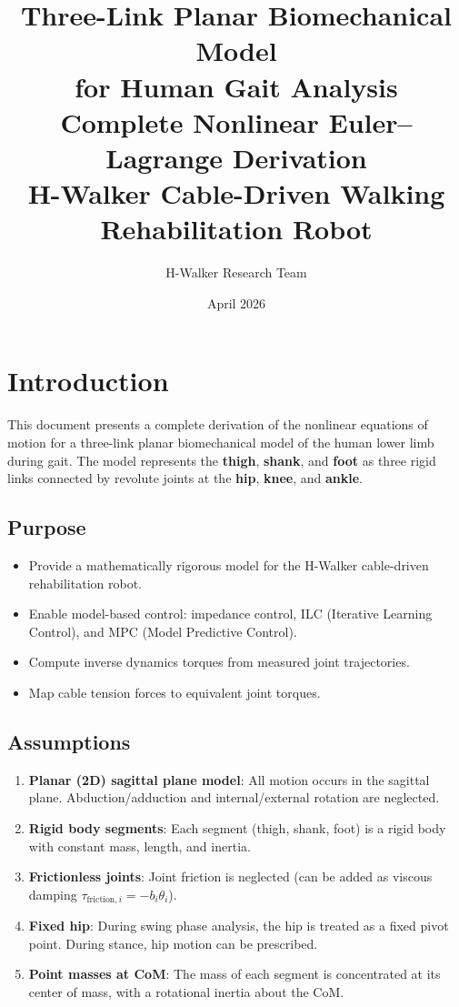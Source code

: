 \documentclass[11pt,a4paper]{article}
\title{
    \vspace{-1cm}
    {\LARGE \textbf{Three-Link Planar Biomechanical Model}} \\[0.3cm]
    {\Large \textbf{for Human Gait Analysis}} \\[0.5cm]
    {\large Complete Nonlinear Euler--Lagrange Derivation} \\[0.3cm]
    {\normalsize H-Walker Cable-Driven Walking Rehabilitation Robot}
}
\author{H-Walker Research Team}
\date{April 2026}
\newcommand{\dt}[1]{\dot{#1}}
\def\dt#1{#1}%
\begin{document}
\maketitle
\tableofcontents
\newpage

\section{Introduction}

This document presents a complete derivation of the nonlinear equations of
motion for a three-link planar biomechanical model of the human lower limb
during gait. The model represents the \textbf{thigh}, \textbf{shank}, and
\textbf{foot} as three rigid links connected by revolute joints at the
\textbf{hip}, \textbf{knee}, and \textbf{ankle}.

\subsection{Purpose}
\begin{itemize}
    \item Provide a mathematically rigorous model for the H-Walker cable-driven
          rehabilitation robot.
    \item Enable model-based control: impedance control, ILC (Iterative Learning
          Control), and MPC (Model Predictive Control).
    \item Compute inverse dynamics torques from measured joint trajectories.
    \item Map cable tension forces to equivalent joint torques.
\end{itemize}

\subsection{Assumptions}
\begin{enumerate}
    \item \textbf{Planar (2D) sagittal plane model}: All motion occurs in the sagittal plane.
          Abduction/adduction and internal/external rotation are neglected.
    \item \textbf{Rigid body segments}: Each segment (thigh, shank, foot) is a rigid body
          with constant mass, length, and inertia.
    \item \textbf{Frictionless joints}: Joint friction is neglected
          (can be added as viscous damping
          $\tau_{\text{friction},i} = -b_i \dt{\theta}_i$).
    \item \textbf{Fixed hip}: During swing phase analysis, the hip is treated as a
          fixed pivot point. During stance, hip motion can be prescribed.
    \item \textbf{Point masses at CoM}: The mass of each segment is concentrated at
          its center of mass, with a rotational inertia about the CoM.
\end{enumerate}
\end{document}
